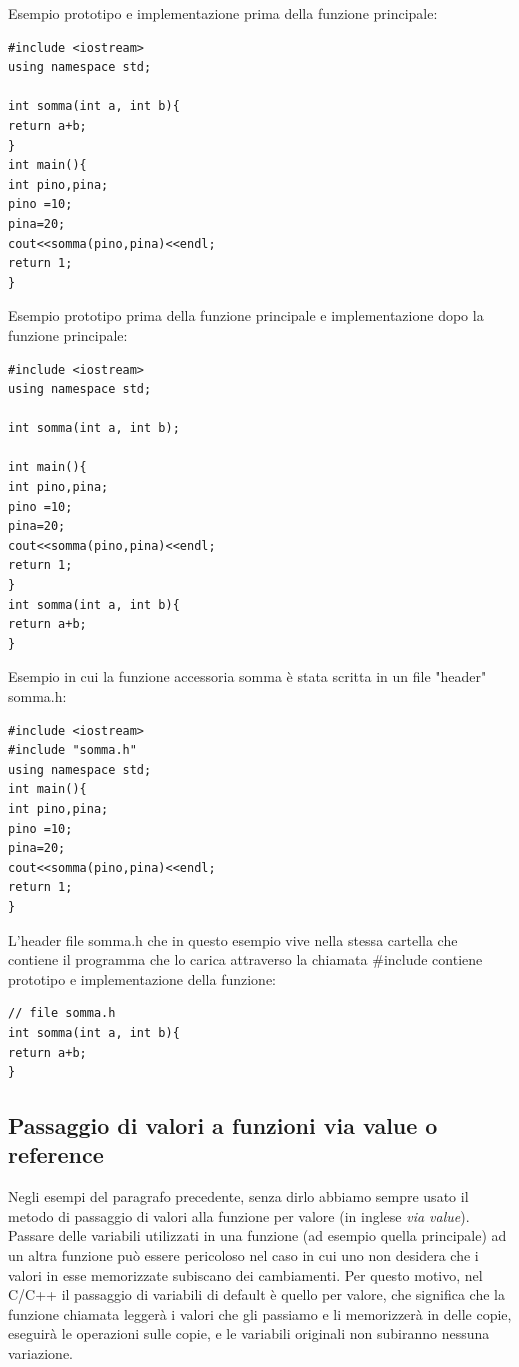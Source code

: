\documentclass[11pt,fleqn]{book} %
\begin{document}
Esempio prototipo e implementazione prima della funzione principale:
\begin{verbatim}
#include <iostream>
using namespace std;

int somma(int a, int b){
return a+b;
}
int main(){
int pino,pina;
pino =10;
pina=20;
cout<<somma(pino,pina)<<endl;
return 1;
}
\end{verbatim}



Esempio prototipo prima della funzione principale e implementazione dopo la funzione principale:
\begin{verbatim}
#include <iostream>
using namespace std;

int somma(int a, int b);

int main(){
int pino,pina;
pino =10;
pina=20;
cout<<somma(pino,pina)<<endl;
return 1;
}
int somma(int a, int b){
return a+b;
}
\end{verbatim}

Esempio in cui la funzione accessoria somma è stata scritta in un file "header" somma.h:

\begin{verbatim}
#include <iostream>
#include "somma.h"
using namespace std;
int main(){
int pino,pina;
pino =10;
pina=20;
cout<<somma(pino,pina)<<endl;
return 1;
}
\end{verbatim}

L'header file somma.h che in questo esempio vive nella stessa cartella che contiene il programma che lo carica attraverso la chiamata \#include contiene prototipo e implementazione della funzione:

\begin{verbatim}
// file somma.h
int somma(int a, int b){
return a+b;
}
\end{verbatim}



\subsection{Passaggio di valori a funzioni via value o reference}

Negli esempi del paragrafo precedente, senza dirlo abbiamo sempre usato il metodo di passaggio di valori alla funzione per valore (in inglese \textit{via value}). Passare delle variabili utilizzati in una funzione (ad esempio quella principale) ad un altra funzione può essere pericoloso nel caso in cui uno non desidera che i valori in esse memorizzate subiscano dei cambiamenti. Per questo motivo, nel C/C++ il passaggio di variabili di default è quello per valore, che significa che la funzione chiamata leggerà i valori che gli passiamo e li memorizzerà in delle copie, eseguirà le operazioni sulle copie, e le variabili originali non subiranno nessuna variazione.
\end{document}
